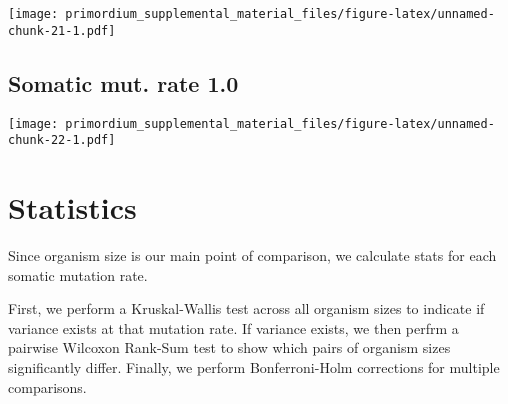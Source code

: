 \documentclass[]{book}
\begin{document}
\texttt{[image: primordium\_supplemental\_material\_files/figure-latex/unnamed-chunk-21-1.pdf]}

\hypertarget{somatic-mut.-rate-1.0}{%
\subsection{Somatic mut. rate 1.0}\label{somatic-mut.-rate-1.0}}

\texttt{[image: primordium\_supplemental\_material\_files/figure-latex/unnamed-chunk-22-1.pdf]}

\hypertarget{statistics}{%
\section{Statistics}\label{statistics}}

Since organism size is our main point of comparison, we calculate stats for each somatic mutation rate.

First, we perform a Kruskal-Wallis test across all organism sizes to indicate if variance exists at that mutation rate.
If variance exists, we then perfrm a pairwise Wilcoxon Rank-Sum test to show which pairs of organism sizes significantly differ.
Finally, we perform Bonferroni-Holm corrections for multiple comparisons.
\end{document}
